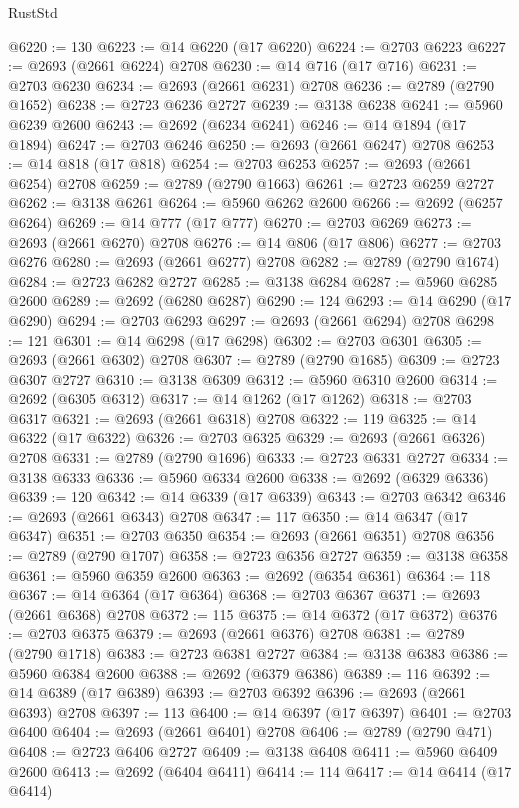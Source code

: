 \begin{lexlean}{RustStd}
\begin{coremodule}
{\begin{coremodule}
{{{{{{{{{{{{{{{{{{{{{{{{{{{{{{{{{{{{{{{@6220 := 130
@6223 := @14 @6220 (@17 @6220)
@6224 := @2703 @6223
@6227 := @2693 (@2661 @6224) @2708
@6230 := @14 @716 (@17 @716)
@6231 := @2703 @6230
@6234 := @2693 (@2661 @6231) @2708
@6236 := @2789 (@2790 @1652)
@6238 := @2723 @6236 @2727
@6239 := @3138 @6238
@6241 := @5960 @6239 @2600
@6243 := @2692 (@6234 @6241)
@6246 := @14 @1894 (@17 @1894)
@6247 := @2703 @6246
@6250 := @2693 (@2661 @6247) @2708
@6253 := @14 @818 (@17 @818)
@6254 := @2703 @6253
@6257 := @2693 (@2661 @6254) @2708
@6259 := @2789 (@2790 @1663)
@6261 := @2723 @6259 @2727
@6262 := @3138 @6261
@6264 := @5960 @6262 @2600
@6266 := @2692 (@6257 @6264)
@6269 := @14 @777 (@17 @777)
@6270 := @2703 @6269
@6273 := @2693 (@2661 @6270) @2708
@6276 := @14 @806 (@17 @806)
@6277 := @2703 @6276
@6280 := @2693 (@2661 @6277) @2708
@6282 := @2789 (@2790 @1674)
@6284 := @2723 @6282 @2727
@6285 := @3138 @6284
@6287 := @5960 @6285 @2600
@6289 := @2692 (@6280 @6287)
@6290 := 124
@6293 := @14 @6290 (@17 @6290)
@6294 := @2703 @6293
@6297 := @2693 (@2661 @6294) @2708
@6298 := 121
@6301 := @14 @6298 (@17 @6298)
@6302 := @2703 @6301
@6305 := @2693 (@2661 @6302) @2708
@6307 := @2789 (@2790 @1685)
@6309 := @2723 @6307 @2727
@6310 := @3138 @6309
@6312 := @5960 @6310 @2600
@6314 := @2692 (@6305 @6312)
@6317 := @14 @1262 (@17 @1262)
@6318 := @2703 @6317
@6321 := @2693 (@2661 @6318) @2708
@6322 := 119
@6325 := @14 @6322 (@17 @6322)
@6326 := @2703 @6325
@6329 := @2693 (@2661 @6326) @2708
@6331 := @2789 (@2790 @1696)
@6333 := @2723 @6331 @2727
@6334 := @3138 @6333
@6336 := @5960 @6334 @2600
@6338 := @2692 (@6329 @6336)
@6339 := 120
@6342 := @14 @6339 (@17 @6339)
@6343 := @2703 @6342
@6346 := @2693 (@2661 @6343) @2708
@6347 := 117
@6350 := @14 @6347 (@17 @6347)
@6351 := @2703 @6350
@6354 := @2693 (@2661 @6351) @2708
@6356 := @2789 (@2790 @1707)
@6358 := @2723 @6356 @2727
@6359 := @3138 @6358
@6361 := @5960 @6359 @2600
@6363 := @2692 (@6354 @6361)
@6364 := 118
@6367 := @14 @6364 (@17 @6364)
@6368 := @2703 @6367
@6371 := @2693 (@2661 @6368) @2708
@6372 := 115
@6375 := @14 @6372 (@17 @6372)
@6376 := @2703 @6375
@6379 := @2693 (@2661 @6376) @2708
@6381 := @2789 (@2790 @1718)
@6383 := @2723 @6381 @2727
@6384 := @3138 @6383
@6386 := @5960 @6384 @2600
@6388 := @2692 (@6379 @6386)
@6389 := 116
@6392 := @14 @6389 (@17 @6389)
@6393 := @2703 @6392
@6396 := @2693 (@2661 @6393) @2708
@6397 := 113
@6400 := @14 @6397 (@17 @6397)
@6401 := @2703 @6400
@6404 := @2693 (@2661 @6401) @2708
@6406 := @2789 (@2790 @471)
@6408 := @2723 @6406 @2727
@6409 := @3138 @6408
@6411 := @5960 @6409 @2600
@6413 := @2692 (@6404 @6411)
@6414 := 114
@6417 := @14 @6414 (@17 @6414)
}}}}}}}}}}}}}}}}}}}}}}}}}}}}}}}}}}}}}}}
\end{coremodule}}
\end{coremodule}
\end{lexlean}
